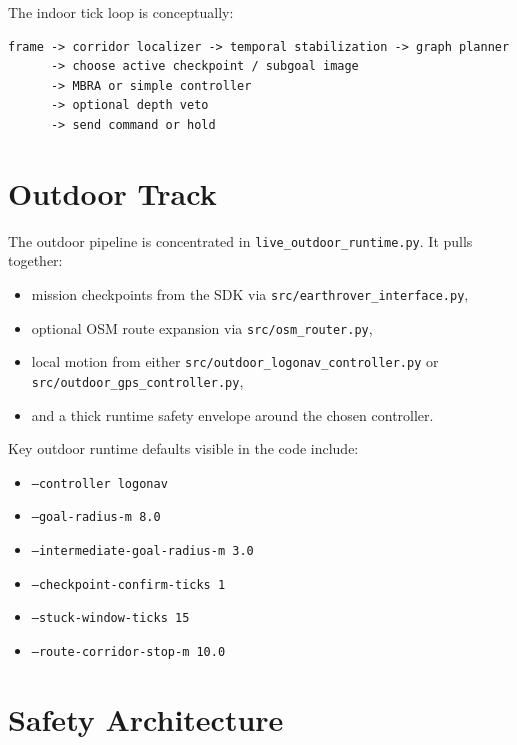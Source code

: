 \documentclass[11pt]{article}
\begin{document}
The indoor tick loop is conceptually:

\begin{lstlisting}
frame -> corridor localizer -> temporal stabilization -> graph planner
      -> choose active checkpoint / subgoal image
      -> MBRA or simple controller
      -> optional depth veto
      -> send command or hold
\end{lstlisting}

\section{Outdoor Track}

The outdoor pipeline is concentrated in \texttt{live\_outdoor\_runtime.py}. It pulls
together:

\begin{itemize}[nosep]
  \item mission checkpoints from the SDK via \texttt{src/earthrover\_interface.py},
  \item optional OSM route expansion via \texttt{src/osm\_router.py},
  \item local motion from either \texttt{src/outdoor\_logonav\_controller.py} or
  \texttt{src/outdoor\_gps\_controller.py},
  \item and a thick runtime safety envelope around the chosen controller.
\end{itemize}

Key outdoor runtime defaults visible in the code include:

\begin{itemize}[nosep]
  \item \texttt{--controller logonav}
  \item \texttt{--goal-radius-m 8.0}
  \item \texttt{--intermediate-goal-radius-m 3.0}
  \item \texttt{--checkpoint-confirm-ticks 1}
  \item \texttt{--stuck-window-ticks 15}
  \item \texttt{--route-corridor-stop-m 10.0}
\end{itemize}

\section{Safety Architecture}
\end{document}
